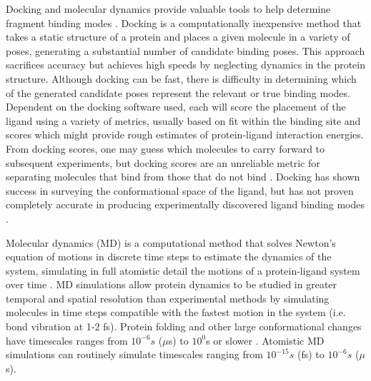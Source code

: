 \documentclass[journal=jcisd8,manuscript=article]{achemso}
\begin{document}
Docking and molecular dynamics provide valuable tools to help determine fragment binding modes \cite{Rocklin2013BlindSite, durrant_computer-aided_2010, sliwoski_computational_2014}. 
Docking is a computationally inexpensive method that takes a static structure of a protein and places a given molecule in a variety of poses, generating a substantial number of candidate binding poses. 
This approach sacrifices accuracy but achieves high speeds by neglecting dynamics in the protein structure.
Although docking can be fast, there is difficulty in determining which of the generated candidate poses represent the relevant or true binding modes.
Dependent on the docking software used, each will score the placement of the ligand using a variety of metrics, usually based on fit within the binding site and scores which might provide rough estimates of protein-ligand interaction energies.
From docking scores, one may guess which molecules to carry forward to subsequent experiments, but docking scores are an unreliable metric for separating molecules that bind from those that do not bind \cite{lape_comparison_2010, plewczynski_can_2011, ramirez_is_2018, gohlke_knowledge-based_2000, warren_critical_2006}.
Docking has shown success in surveying the conformational space of the ligand, but has not proven completely accurate in producing experimentally discovered ligand binding modes \cite{guedes_receptorligand_2013, warren_critical_2006}.

Molecular dynamics (MD) is a computational method that solves Newton's equation of motions in discrete time steps to estimate the dynamics of the system, simulating in full atomistic detail the motions of a protein-ligand system over time \cite{hospital_molecular_2015, hollingsworth_molecular_2018}.
MD simulations allow protein dynamics to be studied in greater temporal and spatial resolution than experimental methods by simulating molecules in time steps compatible with the fastest motion in the system (i.e. bond vibration at 1-2 fs). 
Protein folding and other large conformational changes have timescales ranges from \(10^{-6}s\) (\(\mu\)s) to \(10^{0}\)s or slower \cite{han_protein_2014}. 
Atomistic MD simulations can routinely simulate timescales ranging from \(10^{-15}s\) (fs) to \(10^{-6}s\) (\(\mu\)s). 
\end{document}
